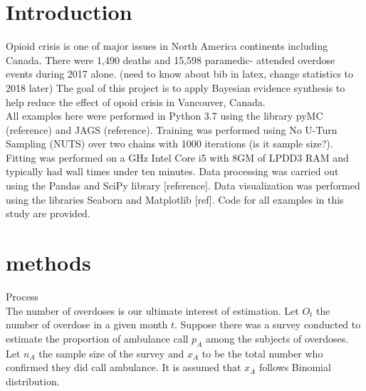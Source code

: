 \documentclass[
10pt, %
a4paper, %
oneside, %
headinclude,footinclude, %
BCOR5mm, %
]{scrartcl}
\begin{document}
\let\thefootnote\relax{}

\let\thefootnote\relax{}


\newpage %


\section{Introduction}
Opioid crisis is one of major issues in North America continents including Canada. There were 1,490 deaths and 15,598 paramedic- attended overdose events during 2017 alone. \cite{Irvine:modelling} (need to know about bib in latex, change statistics to 2018 later) The goal of this project is to apply Bayesian evidence synthesis to help reduce the effect of opoid crisis in Vancouver, Canada.  \\

All examples here were performed in Python 3.7 using the library pyMC (reference) and JAGS (reference). Training was performed using No U-Turn Sampling (NUTS) over two chains with 1000 iterations (is it sample size?). Fitting was performed on a GHz Intel Core i5 with 8GM of LPDD3 RAM and typically had wall times under ten minutes. Data processing was carried out using the Pandas and SciPy library [reference]. Data visualization was performed using the libraries Seaborn and Matplotlib [ref]. Code for all examples in this study are provided. 


\section{methods}

\LARGE Process\\

\normalsize
The number of overdoses is our ultimate interest of estimation. Let $O_t$ the number of overdose in a given month $t$. Suppose there was a survey  conducted to estimate the proportion of ambulance call $p_A$ among the subjects of overdoses. Let $n_{A}$ the sample size of the survey and   
$x_{A}$ to be the total number who confirmed they did call ambulance. It is assumed that $x_{A}$ follows Binomial distribution.
\end{document}
